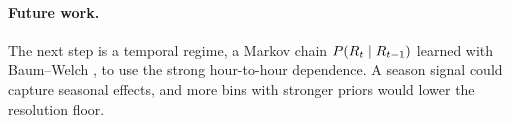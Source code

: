 \paragraph{Future work.} The next step is a temporal regime, a Markov
chain $P(R_t \mid R_{t-1})$ learned with Baum--Welch \citep{rabiner1989hmm},
to use the strong hour-to-hour dependence. A season signal could 
capture seasonal effects, and more bins with 
stronger priors would lower the resolution floor.